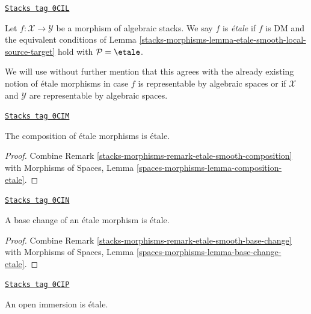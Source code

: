\begin{definition}[Etale]
\label{stacks-morphisms-definition-etale}
\href{https://stacks.math.columbia.edu/tag/0CIL}{\texttt{Stacks tag 0CIL}}

Let $f : \mathcal{X} \to \mathcal{Y}$ be a morphism of algebraic stacks.
We say $f$ is {\it \'etale} if $f$ is DM and the equivalent conditions of
Lemma \ref{stacks-morphisms-lemma-etale-smooth-local-source-target}
hold with $\mathcal{P} = \etale$.
\end{definition}

We will use without further mention that this agrees with the already
existing notion of \'etale morphisms in case $f$ is representable
by algebraic spaces or if $\mathcal{X}$ and $\mathcal{Y}$ are
representable by algebraic spaces.

\begin{lemma}
\label{stacks-morphisms-lemma-composition-etale}
\href{https://stacks.math.columbia.edu/tag/0CIM}{\texttt{Stacks tag 0CIM}}

The composition of \'etale morphisms is \'etale.
\end{lemma}

\begin{proof}
Combine Remark \ref{stacks-morphisms-remark-etale-smooth-composition}
with
Morphisms of Spaces, Lemma \ref{spaces-morphisms-lemma-composition-etale}.
\end{proof}

\begin{lemma}
\label{stacks-morphisms-lemma-base-change-etale}
\href{https://stacks.math.columbia.edu/tag/0CIN}{\texttt{Stacks tag 0CIN}}

A base change of an \'etale morphism is \'etale.
\end{lemma}

\begin{proof}
Combine
Remark \ref{stacks-morphisms-remark-etale-smooth-base-change}
with
Morphisms of Spaces, Lemma \ref{spaces-morphisms-lemma-base-change-etale}.
\end{proof}

\begin{lemma}
\label{stacks-morphisms-lemma-open-immersion-etale}
\href{https://stacks.math.columbia.edu/tag/0CIP}{\texttt{Stacks tag 0CIP}}

An open immersion is \'etale.
\end{lemma}

